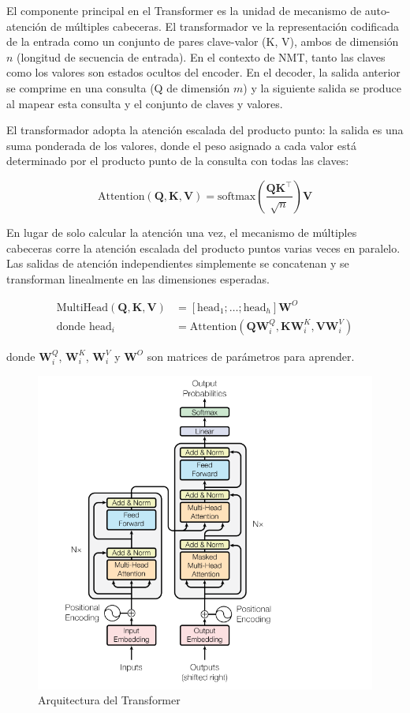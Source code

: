 \documentclass[conference]{IEEEtran}
\begin{document}
El componente principal en el Transformer es la unidad de mecanismo de auto-atenci\'on de m\'ultiples cabeceras. El transformador ve la representaci\'on codificada de la entrada como un conjunto de pares clave-valor (K, V), ambos de dimensi\'on $n$ (longitud de secuencia de entrada). En el contexto de NMT, tanto las claves como los valores son estados ocultos del encoder. En el decoder, la salida anterior se comprime en una consulta (Q de dimensi\'on $m$) y la siguiente salida se produce al mapear esta consulta y el conjunto de claves y valores.

\vspace{0.2cm}

El transformador adopta la atenci\'on escalada del producto punto: la salida es una suma ponderada de los valores, donde el peso asignado a cada valor est\'a determinado por el producto punto de la consulta con todas las claves:

\[
\text{Attention}(\mathbf{Q}, \mathbf{K}, \mathbf{V}) = \text{softmax}(\frac{\mathbf{Q}\mathbf{K}^\top}{\sqrt{n}})\mathbf{V}
\]


En lugar de solo calcular la atenci\'on una vez, el mecanismo de m\'ultiples cabeceras corre la atenci\'on escalada del producto puntos varias veces en paralelo. Las salidas de atenci\'on independientes simplemente se concatenan y se transforman linealmente en las dimensiones esperadas.

\begin{align*}
\text{MultiHead}(\mathbf{Q}, \mathbf{K}, \mathbf{V}) &= [\text{head}_1; \dots; \text{head}_h]\mathbf{W}^O \\
\text{donde head}_i &= \text{Attention}(\mathbf{Q}\mathbf{W}^Q_i, \mathbf{K}\mathbf{W}^K_i, \mathbf{V}\mathbf{W}^V_i)
\end{align*}

donde $\mathbf{W}^Q_i$, $\mathbf{W}^K_i$, $\mathbf{W}^V_i$ y $\mathbf{W}^O$ son matrices de par\'ametros para aprender.


\begin{figure}[h]
	\centering
	\includegraphics[scale=.12]{imagenes/transformer.png}
	\caption{Arquitectura del Transformer} 
\end{figure}
\end{document}
